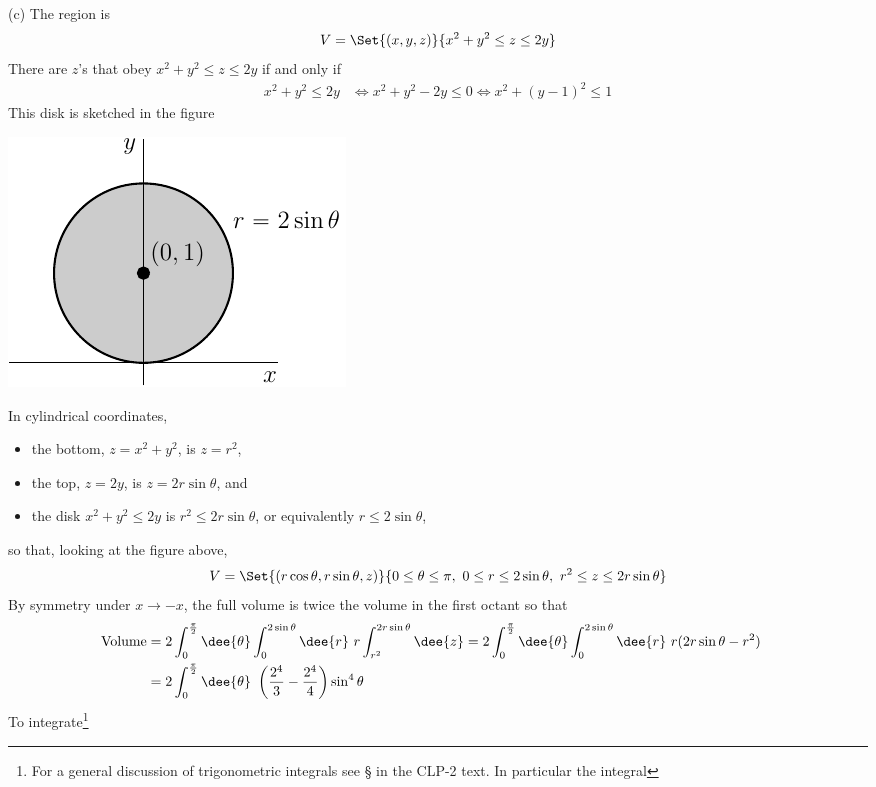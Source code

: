 \begin{solution}
(c) The region is 
\begin{equation*}
V = \Set{(x,y,z)}{x^2+y^2\le z\le 2y}
\end{equation*}
There are $z$'s that obey $x^2+y^2\le z\le 2y$ if and only if
\begin{align*}
x^2+y^2\le 2y
&\iff x^2+y^2-2y \le 0
 \iff x^2 + (y-1)^2 \le 1
\end{align*}
This disk is sketched in the figure
\begin{center}
     \includegraphics{fig/domain2bis.pdf}
\end{center}
In cylindrical coordinates, 
\begin{itemize}
\item
the bottom, $z=x^2+y^2$, is $z=r^2$, 
\item
the top, $z=2y$, is $z=2r\sin\theta$, and 
\item
the disk $x^2+y^2\le 2y$ is $r^2\le 2r\sin\theta$, or equivalently $r\le2\sin\theta$, 
\end{itemize}
so that, looking at the figure above,
\begin{equation*}
V = \Set{(r\cos\theta,r\sin\theta,z)}{0\le\theta\le\pi,
                \ 0\le r\le 2\sin\theta,\ r^2\le z\le 2r\sin\theta}
\end{equation*}
By symmetry under $x\rightarrow -x$, 
the full volume is twice the volume in the first octant so that
\begin{align*}
\text{Volume} 
&= 2\int_{0}^{{\pi\over 2}} \dee{\theta}\int_0^{2\sin\theta}\dee{r}\ r\int_{r^2}^{2r\sin\theta}\dee{z}
= 2\int_{0}^{{\pi\over 2}} \dee{\theta}\int_0^{2\sin\theta}\dee{r}\ r(2r\sin\theta-r^2)\cr
&= 2\int_{0}^{{\pi\over 2}} \dee{\theta}\ \left(\frac{2^4}{3}-\frac{2^4}{4}\right)\sin^4\theta
\end{align*}
To integrate\footnote{For a general discussion of trigonometric integrals see
\S{} in the CLP-2 text. In particular the integral  
}
\end{solution}
